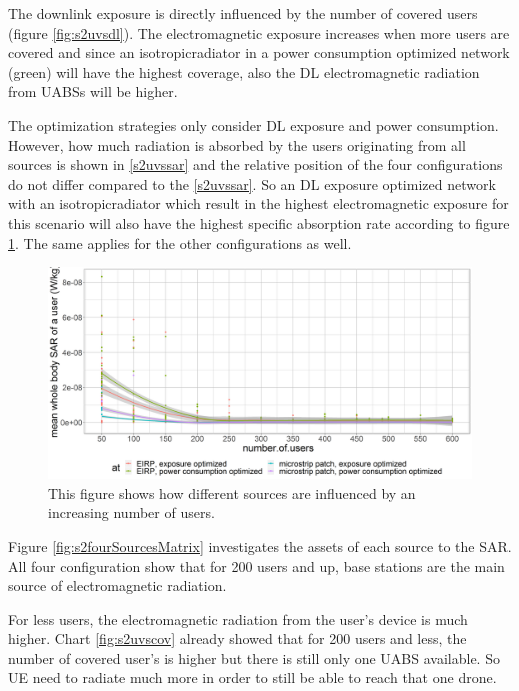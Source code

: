 The downlink exposure is directly influenced by the number of covered users (figure \ref{fig:s2uvsdl}). 
The electromagnetic exposure increases when more users are covered and since an \gls{isotropicradiator} in a power consumption optimized network (green)
will have the highest coverage, also the \gls{DL} electromagnetic radiation from \gls{UABS}s will be higher.

The optimization strategies only consider \gls{DL} exposure and power consumption.
However, how much radiation is absorbed by the users originating from all sources is shown in \ref{s2uvssar} and the relative position of 
the four configurations do not differ compared to the \ref{s2uvssar}. So an \gls{DL} exposure optimized network with an \gls{isotropicradiator}
 which result in the highest electromagnetic exposure for this scenario will also have the highest specific absorption rate according to figure
 \ref{fig:s2uvssar}. The same applies for the other configurations as well.

\begin{figure}[h!]
  \includegraphics[width=\textwidth]{../results/s2/uvssar.png}
  \caption{This figure shows how different sources are influenced by an increasing number of users. }
  \label{fig:s2uvssar}
\end{figure}

Figure \ref{fig:s2fourSourcesMatrix} investigates the assets of each source to the \gls{SAR}. All four 
configuration show that for 200 users and up, base stations are the main source of electromagnetic radiation.

For less users, the electromagnetic radiation from the user's device is much higher. Chart \ref{fig:s2uvscov} already 
showed that for 200 users and less, the number of covered user's is higher  but there is still only one \gls{UABS} available.
So \gls{UE}  need to radiate much more in order to still be able to reach that one drone.

